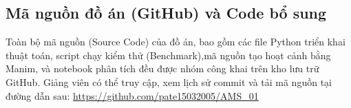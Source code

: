 \documentclass[12pt,a4paper]{article}
\begin{document}
\subsection{Mã nguồn đồ án (GitHub) và Code bổ sung}

Toàn bộ mã nguồn (Source Code) của đồ án, bao gồm các file Python triển khai thuật toán, script chạy kiểm thử (Benchmark),mã nguồn tạo hoạt cảnh bằng Manim, và notebook phân tích đều được nhóm công khai trên kho lưu trữ GitHub. Giảng viên có thể truy cập, xem lịch sử commit và tải mã nguồn tại đường dẫn sau:
    \url{https://github.com/pate15032005/AMS_01}\\[2cm]

\end{document}
